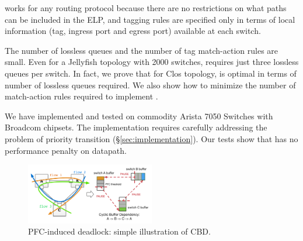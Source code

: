 \sysname works for any routing protocol because there are no restrictions on what
paths can be included in the ELP, and tagging rules are specified only in terms
of local information (tag, ingress port and egress port) available at each
switch. 

The number of lossless queues and the number of tag match-action rules are
small.  Even for a Jellyfish topology with 2000 switches, \sysname{} requires
just three lossless queues per switch.  In fact, we prove that for Clos
topology,  \sysname{} is optimal in terms of number of lossless queues required.
We also show how to minimize the number of match-action rules required to
implement \sysname{}.

We have implemented and tested \sysname{} on commodity Arista 7050 Switches with
Broadcom chipsets. The implementation requires carefully addressing the problem
of priority transition (\S\ref{sec:implementation}). Our tests show that
\sysname{} has no performance penalty on datapath.

\begin{figure}
	\centering
	\includegraphics[width=0.5\textwidth] {figs/deadlock}
	\vspace{-0.15in}
	\caption{PFC-induced deadlock: simple illustration of CBD.}
	\vspace{-0.15in}
	\label{fig:deadlock_example}
\end{figure}

